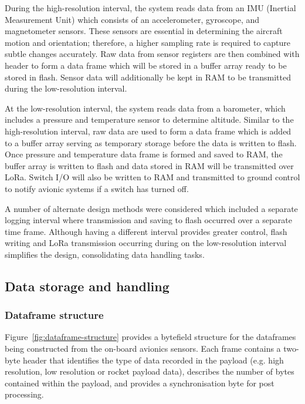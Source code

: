 During the high-resolution interval, the system reads data from an IMU (Inertial Measurement Unit) which consists of an accelerometer, gyroscope, and magnetometer sensors. These sensors are essential in determining the aircraft motion and orientation; therefore, a higher sampling rate is required to capture subtle changes accurately. Raw data from sensor registers are then combined with header to form a data frame which will be stored in a buffer array ready to be stored in flash. Sensor data will additionally be kept in RAM to be transmitted during the low-resolution interval.  

At the low-resolution interval, the system reads data from a barometer, which includes a pressure and temperature sensor to determine altitude. Similar to the high-resolution interval, raw data are used to form a data frame which is added to a buffer array serving as temporary storage before the data is written to flash. Once pressure and temperature data frame is formed and saved to RAM, the buffer array is written to flash and data stored in RAM will be transmitted over LoRa. Switch I/O will also be written to RAM and transmitted to ground control to notify avionic systems if a switch has turned off.  

A number of alternate design methods were considered which included a separate logging interval where transmission and saving to flash occurred over a separate time frame. Although having a different interval provides greater control, flash writing and LoRa transmission occurring during on the low-resolution interval simplifies the design, consolidating data handling tasks.  

\subsection{Data storage and handling}
\subsubsection{Dataframe structure}\label{sec:dataframe-structure}
Figure~\ref{fig:dataframe-structure} provides a bytefield structure for the dataframes being constructed from the on-board avionics sensors. Each frame contains a two-byte header that identifies the type of data recorded in the payload (e.g. high resolution, low resolution or rocket payload data), describes the number of bytes contained within the payload, and provides a synchronisation byte for post processing.\\[0.5em]

